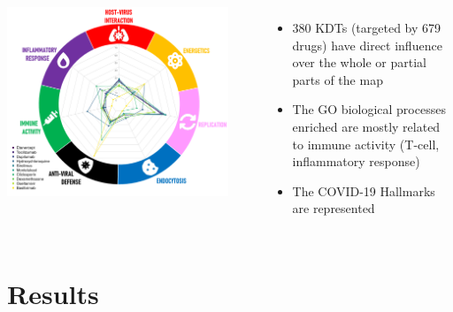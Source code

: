 \documentclass[compress,ignorenonframetext,aspectratio=1610]{beamer}
\begin{document}
\begin{frame}
	\begin{columns}
		\centering
		\includegraphics[width=0.9\textwidth]{figs/methods/radar.png}
		
		\begin{itemize}
		\item 380 KDTs (targeted by 679 drugs) have direct influence over the whole or partial parts of the map
		\vspace*{1em}
		\item The GO biological processes enriched are mostly related to immune activity (T-cell, inflammatory response)
		\vspace*{1em}
		\item The COVID-19 Hallmarks are represented
	\end{itemize}
	\end{columns}
\end{frame}



\section{Results}
\end{document}
